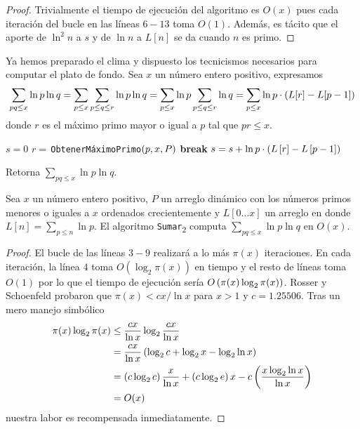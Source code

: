 \begin{proof}
    Trivialmente el tiempo de ejecuci\'on del algoritmo es \(O(x)\) pues
    cada iteraci\'on del bucle en las l\'ineas \(6-13\) toma \(O(1)\).
    Adem\'as, es t\'acito que el aporte de \(\ln^2 n\) a \(s\) y de \(\ln n\) a \(L[n]\)
    se da cuando \(n\) es primo.
\end{proof}

Ya hemos preparado el clima
y dispuesto los tecnicismos necesarios para
computar el plato de fondo.
Sea \(x\) un n\'umero entero positivo, expresamos
\[
    \sum_{pq \leq x} \ln p \ln q
    = \sum_{p \leq x} \sum_{p \leq q \leq r} \ln p \ln q
    = \sum_{p \leq x} \ln p \sum_{p \leq q \leq r} \ln q
    = \sum_{p \leq x} \ln p \cdot \left( L[r] - L[p - 1] \right)
\]
donde \(r\) es el m\'aximo primo mayor o igual a \(p\) tal que \(pr \leq x\).

\begin{algorithm}[H]
    \SetAlgoLined
    \DontPrintSemicolon
     {
        \(s = 0\)\;
         {
            \(r =\,\)\texttt{ObtenerM\'aximoPrimo}\(\left( p, x, P \right)\)\;
             {
                \textbf{break}\;
            }
            \(s = s + \ln p \cdot \left( L\left[ r \right] - L\left[ p - 1 \right] \right)\)\;
        }
    }
    \caption{Retorna \(\sum_{pq \leq x} \ln p \ln q\).}
\end{algorithm}

\begin{theorem}
    \label{thm:sum-2}
    Sea \(x\) un n\'umero entero positivo,
    \(P\) un arreglo din\'amico con los n\'umeros primos menores o iguales a \(x\) ordenados crecientemente y
    \(L[0 \dots x]\) un arreglo en donde \(L[n] = \sum_{p \leq n} \ln p\).
    El algoritmo \texttt{Sumar}\textsubscript{2} computa \(\sum_{pq \leq x} \ln p \ln q\) en \(O(x)\).
\end{theorem}

\begin{proof}
    El bucle de las l\'ineas \(3-9\) realizar\'a a lo m\'as \(\pi(x)\) iteraciones.
    En cada iteraci\'on, la l\'inea \(4\) toma \(O(\log_2\pi(x))\) en tiempo
    y el resto de l\'ineas toma \(O(1)\) por lo que el tiempo de ejecuci\'on ser\'ia
    \(O\left( \pi(x) \log_2\pi(x) \right)\).
    Rosser y Schoenfeld \cite[corolario 1]{Rosser1962} probaron que
    \(\pi(x) < cx / \ln x\) para \(x > 1\) y \(c = 1.25506\).
    Tras un mero manejo simb\'olico
    \begin{align*}
        \pi(x) \log_2 \pi(x) &\leq \frac{cx}{\ln x} \log_2 \frac{cx}{\ln x} \\
        &= \frac{cx}{\ln x} \left( \log_2 c + \log_2 x - \log_2 \ln x \right) \\
        &= \left( c \log_2 c \right)\frac{x}{\ln x} + \left( c \log_2 e \right)x - c\left( \frac{x \log_2 \ln x}{\ln x} \right) \\
        &= O(x)
    \end{align*}
    nuestra labor es recompensada inmediatamente.
\end{proof}

